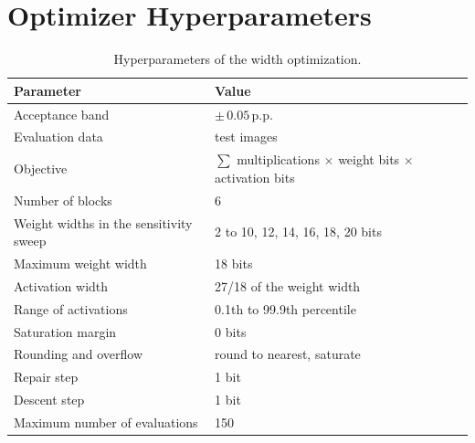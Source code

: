 \section{Optimizer Hyperparameters}\label{app:optimizer}

\begin{table}[H]
    \centering
    \caption{Hyperparameters of the width optimization.}
    \label{tab:optimizer}
    \begin{tabular}{@{}p{6.6cm}p{7.6cm}@{}}
        \toprule
        Parameter & Value \\
        \midrule
        Acceptance band & $\pm\,0.05$\,p.p. \\
        Evaluation data & test images \\
        Objective & $\sum$ multiplications $\times$ weight bits $\times$ activation bits \\
        Number of blocks & 6 \\
        Weight widths in the sensitivity sweep & 2 to 10, 12, 14, 16, 18, 20 bits \\
        Maximum weight width & 18 bits \\
        Activation width & 27/18 of the weight width \\
        Range of activations & 0.1th to 99.9th percentile \\
        Saturation margin & 0 bits \\
        Rounding and overflow & round to nearest, saturate \\
        Repair step & 1 bit \\
        Descent step & 1 bit \\
        Maximum number of evaluations & 150 \\
        \bottomrule
    \end{tabular}
\end{table}
